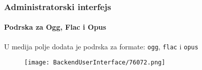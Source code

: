 \begin{frame}[fragile]
	\frametitle{Administratorski interfejs}
	\framesubtitle{Podrska za Ogg, Flac i Opus}

	U medija polje dodata je podrska za formate:
	\texttt{ogg}, \texttt{flac} i \texttt{opus}

	\begin{figure}
		\texttt{[image: BackendUserInterface/76072.png]}
	\end{figure}

\end{frame}


